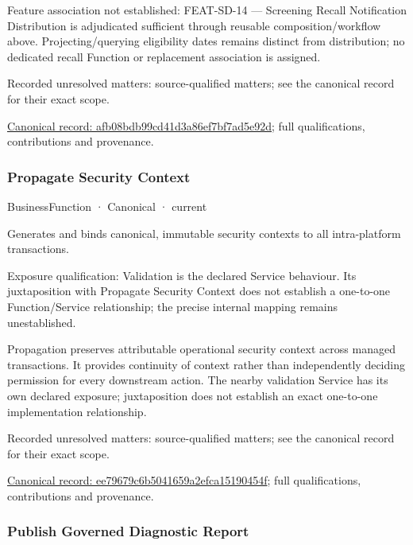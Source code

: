Feature association not established: FEAT-SD-14 — Screening Recall Notification Distribution is adjudicated sufficient through reusable composition/workflow above. Projecting/querying eligibility dates remains distinct from distribution; no dedicated recall Function or replacement association is assigned.


{\small Recorded unresolved matters: source-qualified matters; see the canonical record for their exact scope.}\par
{\footnotesize \href{../../../../continuum/business/business-function/afb08bdb99cd41d3a86ef7bf7ad5e92d.md}{Canonical record: afb08bdb99cd41d3a86ef7bf7ad5e92d}; full qualifications, contributions and provenance.}\par
\subsubsection{Propagate Security Context}

\label{element:ee79679c6b5041659a2efca15190454f}
{\small BusinessFunction · Canonical · current}\par

Generates and binds canonical, immutable security contexts to all intra-platform transactions.



Exposure qualification: Validation is the declared Service behaviour. Its juxtaposition with Propagate Security Context does not establish a one-to-one Function/Service relationship; the precise internal mapping remains unestablished.



Propagation preserves attributable operational security context across managed transactions. It provides continuity of context rather than independently deciding permission for every downstream action. The nearby validation Service has its own declared exposure; juxtaposition does not establish an exact one-to-one implementation relationship.


{\small Recorded unresolved matters: source-qualified matters; see the canonical record for their exact scope.}\par
{\footnotesize \href{../../../../continuum/business/business-function/ee79679c6b5041659a2efca15190454f.md}{Canonical record: ee79679c6b5041659a2efca15190454f}; full qualifications, contributions and provenance.}\par
\subsubsection{Publish Governed Diagnostic Report}

